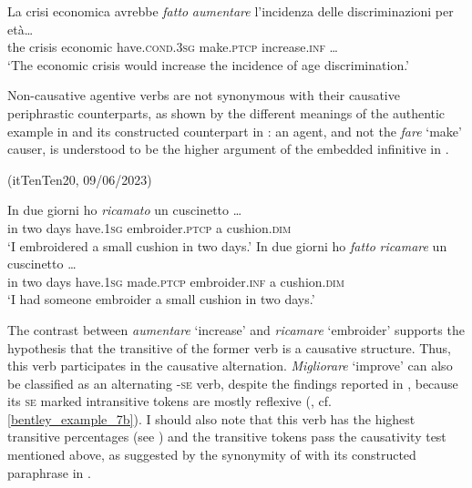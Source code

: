 \documentclass[output=paper,colorlinks,citecolor=brown
]{langscibook}
\begin{document}
\ea \label{bentley_example_10}
    \gll La	crisi		economica	avrebbe 							\textit{fatto} \textit{aumentare} {l’incidenza delle discriminazioni per età\ldots}\\
    				the	crisis	economic		have.\textsc{cond}.3\textsc{sg}	make.\textsc{ptcp}	increase.\textsc{inf} {\ldots} \\
    \glt  	‘The economic crisis would increase the incidence of age discrimination.’
\z

Non-causative agentive verbs are not synonymous with their causative periphrastic counterparts, as shown by the different meanings of the authentic example in  and its constructed counterpart in : an agent, and not the \textit{fare} ‘make’ causer, is understood to be the higher argument of the embedded infinitive in .

\hspace*{\fill}(itTenTen20, 09/06/2023)\quad

\ea \label{bentley_example_11}
    \ea \label{bentley_example_11a}
    \gll In	due	giorni	ho						\textit{ricamato}						un cuscinetto \ldots  \\
    in	two	days			have.1\textsc{sg}	embroider.\textsc{ptcp}	a			cushion.\textsc{dim}\\
    \glt ‘I embroidered a small cushion in two days.’
    \ex \label{bentley_example_11b}
    \gll In	due	giorni	ho						\textit{fatto}						\textit{ricamare}					un	cuscinetto \ldots  \\
   	in	two	days			have.1\textsc{sg}	made.\textsc{ptcp}	embroider.\textsc{inf}		a			cushion.\textsc{dim} \\
    \glt ‘I had someone embroider a small cushion in two days.’
    \z
\z

The contrast between \textit{aumentare} ‘increase’ and \textit{ricamare} ‘embroider’ supports the hypothesis that the transitive of the former verb is a causative structure. Thus, this verb participates in the causative alternation. 
\textit{Migliorare} ‘improve’ can also be classified as an alternating -\textsc{se} verb, despite the findings reported in , because its \textsc{se} marked intransitive tokens are mostly reflexive (, cf. \ref{bentley_example_7b}). I should also note that this verb has the highest transitive percentages (see ) and the transitive tokens pass the causativity test mentioned above, as suggested by the synonymity of  with its constructed paraphrase in .
\end{document}
